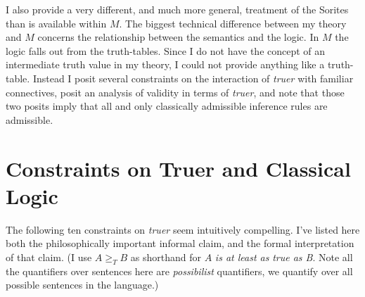 \noindent I also provide a very different, and much more general, treatment of the Sorites than is available within \(M\). The biggest technical difference between my theory and \(M\) concerns the relationship between the semantics and the logic. In \(M\) the logic falls out from the truth-tables. Since I do not have the concept of an intermediate truth value in my theory, I could not provide anything like a truth-table. Instead I posit several constraints on the interaction of \textit{truer} with familiar connectives, posit an analysis of validity in terms of \textit{truer}, and note that those two posits imply that all and only classically admissible inference rules are admissible.

\section{Constraints on Truer and Classical Logic}
The following ten constraints on \textit{truer} seem intuitively compelling. I've listed here both the philosophically important informal claim, and the formal interpretation of that claim. (I use \(A \geqslant _T B\) as shorthand for \(A\) \textit{is at least as }\textit{true as B}. Note all the quantifiers over sentences here are \textit{possibilist} quantifiers, we quantify over all possible sentences in the language.)

